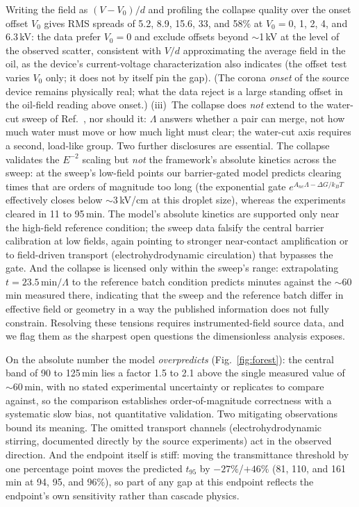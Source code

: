 \documentclass[aps,prfluids,reprint,amsmath,amssymb,superscriptaddress,longbibliography]{revtex4-2}
\begin{document}
Writing the field as $(V-V_0)/d$ and profiling the collapse quality over
the onset offset $V_0$ gives RMS spreads of 5.2, 8.9, 15.6, 33, and 58\%
at $V_0=0$, 1, 2, 4, and 6.3\,kV: the data prefer $V_0=0$ and exclude
offsets beyond $\sim$1\,kV at the level of the observed scatter,
consistent with $V/d$ approximating the average field in the oil, as the
device's current-voltage characterization also indicates (the offset test
varies $V_0$ only; it does not by itself pin the gap).
(The corona \emph{onset} of the source device remains physically real;
what the data reject is a large standing offset in the oil-field reading
above onset.)
(iii)~The collapse does \emph{not} extend to the water-cut sweep of
Ref.~\cite{panat2025}, nor should it: $\Lambda$ answers whether a pair can
merge, not how much water must move or how much light must clear; the
water-cut axis requires a second, load-like group. Two further disclosures are essential. The collapse validates the
$E^{-2}$ scaling but \emph{not} the framework's absolute kinetics across
the sweep: at the sweep's low-field points our barrier-gated model predicts
clearing times that are orders of magnitude too long (the exponential gate
$e^{A_{nc}\Lambda-\Delta G/k_BT}$ effectively closes below
$\sim$3\,kV/cm at this droplet size), whereas the experiments cleared in
11 to 95\,min. The model's absolute kinetics are supported only near the
high-field reference condition; the sweep data falsify the central barrier
calibration at low fields, again pointing to stronger near-contact
amplification or to field-driven transport (electrohydrodynamic
circulation) that bypasses the gate. And the collapse is licensed only
within the sweep's range: extrapolating $t=23.5\,\text{min}/\Lambda$ to
the reference batch condition predicts minutes against the $\sim$60\,min
measured there, indicating that the sweep and the reference batch differ in
effective field or geometry in a way the published information does not
fully constrain. Resolving these tensions requires instrumented-field
source data, and we flag them as the sharpest open questions the
dimensionless analysis exposes.

On the absolute number the model \emph{overpredicts}
(Fig.~\ref{fig:forest}): the central band of
90 to 125\,min lies a factor 1.5 to 2.1 above the single measured value of
$\sim$60\,min, with no stated experimental uncertainty or replicates to
compare against, so the comparison establishes order-of-magnitude
correctness with a systematic slow bias, not quantitative validation. Two
mitigating observations bound its meaning. The omitted transport channels
(electrohydrodynamic stirring, documented directly by the source
experiments) act in the observed direction. And the endpoint itself is
stiff: moving the transmittance threshold by one percentage point moves the
predicted $t_{95}$ by $-27\%$/$+46\%$ (81, 110, and 161\,min at 94, 95,
and 96\%), so part of any gap at this endpoint reflects the endpoint's own
sensitivity rather than cascade physics.
\end{document}
